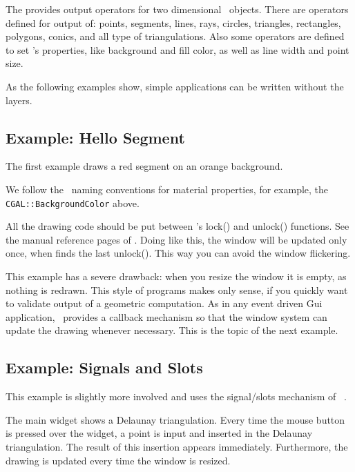 The  provides output operators for two dimensional \cgal\
objects. There are operators defined for output of: points, segments, 
lines, rays, circles, triangles, rectangles, polygons, conics,  and all type of
triangulations. Also some operators are defined to set
's properties, like background and fill color, as
well as line width and point size.

As the following examples show, simple applications can be written
without the layers.

\subsection{Example: Hello Segment}
The first example draws a red segment on an orange background.

We follow the \qt\ naming conventions for material properties, for
example, the {\tt CGAL::BackgroundColor} above.

All the drawing code should be put between 's lock() and
unlock() functions. See the manual reference pages of
. Doing like this, the window will be updated only
once, when \ccStyle{Qt\_widget} finds the last unlock(). This way you
can avoid the window flickering.

This example has a severe drawback: when you resize the window it is
empty, as nothing is redrawn. This style of programs makes
only sense, if you quickly want to validate output of a geometric
computation. As in any event driven {\sc Gui} application,
 \qt\  provides a callback mechanism so
that the window system can update the drawing
whenever necessary. This is the topic of the next example.

\subsection{Example: Signals and Slots}

This example is slightly more involved and uses  the
signal/slots mechanism of \qt\ .

The main widget shows a
Delaunay triangulation. Every time the mouse button is pressed over 
the widget, a point is input  and inserted in the Delaunay
triangulation. The result of this insertion appears immediately.
Furthermore, the drawing is  updated every time the window is resized.




